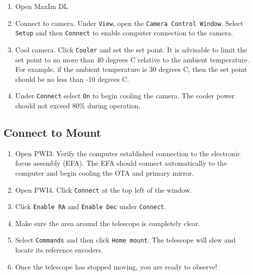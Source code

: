 \documentclass{article}
\begin{document}
			\begin{enumerate}
				
				\item Open MaxIm DL
							
				\item Connect to camera. Under \texttt{View}, open the \texttt{Camera Control Window}. Select \texttt{Setup} and then \texttt{Connect} to enable computer connection to the camera.
				
				\item Cool camera. Click \texttt{Cooler} and set the set point. It is advisable to limit the set point to no more than 40 degrees C relative to the ambient temperature. For example, if the ambient temperature is 30 degrees C, then the set point should be no less than -10 degrees C.
				
				\item Under \texttt{Connect} select \texttt{On} to begin cooling the camera. The cooler power should not exceed 80\% during operation.
				
			\end{enumerate}
		
		\subsection{Connect to Mount}
		
			\begin{enumerate}
				
				\item Open PWI3. Verify the computer established connection to the electronic focus assembly (EFA). The EFA should connect automatically to the computer and begin cooling the OTA and primary mirror.
				
				\item Open PWI4. Click \texttt{Connect} at the top left of the window.
				
				\item Click \texttt{Enable RA} and \texttt{Enable Dec} under \texttt{Connect}.
	
				\item Make sure the area around the telescope is completely clear.
	
				\item Select \texttt{Commands} and then click \texttt{Home mount}. The telescope will slew and locate its reference encoders.
				
				\item Once the telescope has stopped moving, you are ready to observe!
							
			\end{enumerate}
		
\end{document}
